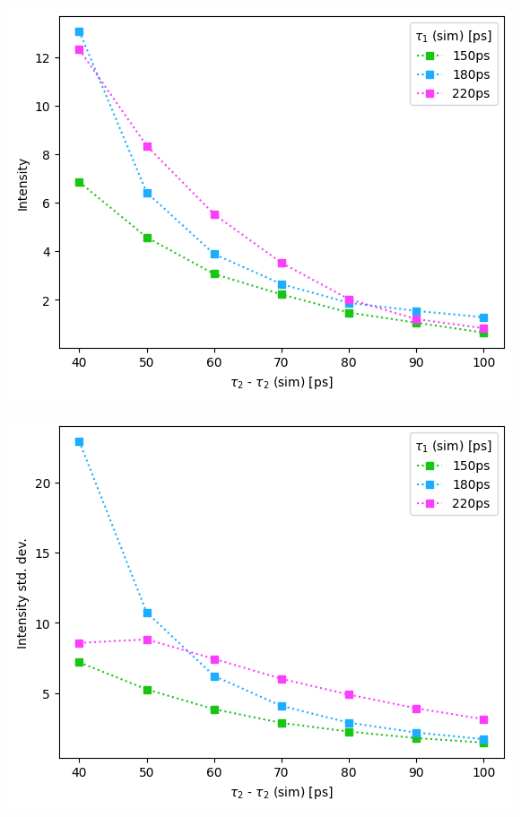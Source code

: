{\begin{minipage}{.47\linewidth}
    \includegraphics[width=\linewidth]{Batch 3/regular IRF/2080-diff i1.png}
    \label{fig:comp-I-2080}
\end{minipage}
\hfill
\begin{minipage}{.47\linewidth}
    \includegraphics[width=\linewidth]{Batch 3/regular IRF/2080-err i1.png}
    \label{fig:comp-Ierr-2080}
\end{minipage}
\begin{minipage}{.47\linewidth}

\end{minipage}}
